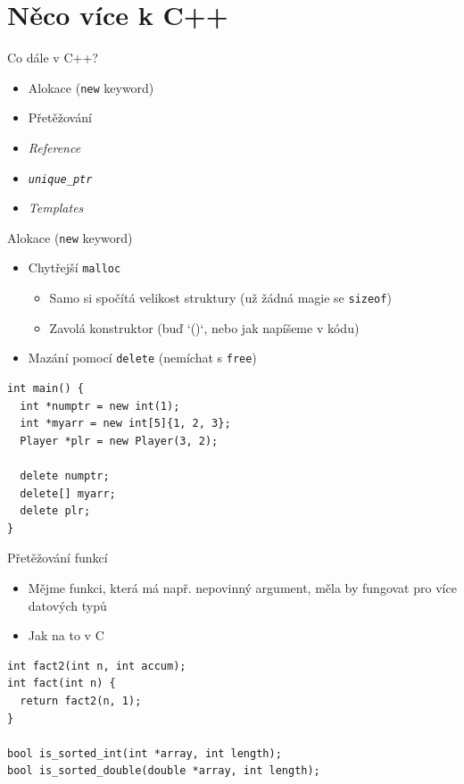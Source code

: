 \documentclass[aspectratio=1610]{beamer}
\begin{document}
\section{Něco více k C++}

\begin{frame}{Co dále v C++?}

\begin{itemize}
  \item Alokace (\texttt{new} keyword)
  \item Přetěžování
  \item \textit{Reference}
  \item \textit{\texttt{unique\_ptr}}
  \item \textit{Templates}
\end{itemize}

\end{frame}

\begin{frame}[fragile]{Alokace (\texttt{new} keyword)}

\begin{itemize}
  \item Chytřejší \texttt{malloc}
    \begin{itemize}
      \item Samo si spočítá velikost struktury (už žádná magie se \texttt{sizeof})
      \item Zavolá konstruktor (buď `()`, nebo jak napíšeme v kódu)
    \end{itemize}
  \item Mazání pomocí \texttt{delete} (nemíchat s \texttt{free})
\end{itemize}

\begin{verbatim}
int main() {
  int *numptr = new int(1);
  int *myarr = new int[5]{1, 2, 3};
  Player *plr = new Player(3, 2);

  delete numptr;
  delete[] myarr;
  delete plr;
}
\end{verbatim}

\end{frame}

\begin{frame}[fragile]{Přetěžování funkcí}

\begin{itemize}
  \item Mějme funkci, která má např. nepovinný argument, měla by fungovat pro více datových typů
  \item Jak na to v C
\end{itemize}

\begin{verbatim}
int fact2(int n, int accum);
int fact(int n) {
  return fact2(n, 1);
}

bool is_sorted_int(int *array, int length);
bool is_sorted_double(double *array, int length);
\end{verbatim}

\end{frame}
\end{document}

